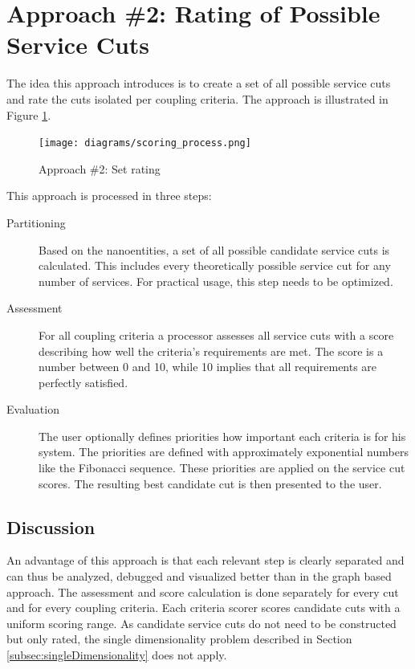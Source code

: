 \section{Approach \#2: Rating of Possible Service Cuts}

The idea this approach introduces is to create a set of all possible service cuts and rate the cuts isolated per coupling criteria. The approach is illustrated in Figure \ref{fig:setProcess}.


\begin{figure}[H]
	\begin{center}
		\texttt{[image: diagrams/scoring\_process.png]}
	\end{center}
	\caption{Approach \#2: Set rating}
	\label{fig:setProcess}
\end{figure}

This approach is processed in three steps:

\begin{description}
	\item[Partitioning] Based on the nanoentities, a set of all possible candidate service cuts is calculated. This includes every theoretically possible service cut for any number of services. For practical usage, this step needs to be optimized. 
	\item[Assessment] For all coupling criteria a processor assesses all service cuts with a score describing how well the criteria's requirements are met. The score is a number between 0 and 10, while 10 implies that all requirements are perfectly satisfied. 
	\item[Evaluation] The user optionally defines priorities how important each criteria is for his system. The priorities are defined with approximately exponential numbers like the Fibonacci sequence. These priorities are applied on the service cut scores. The resulting best candidate cut is then presented to the user.
\end{description}

\subsection{Discussion}

An advantage of this approach is that each relevant step is clearly separated and can thus be analyzed, debugged and visualized better than in the graph based approach. The assessment and score calculation is done separately for every cut and for every coupling criteria. Each criteria scorer scores candidate cuts with a uniform scoring range. As candidate service cuts do not need to be constructed but only rated, the single dimensionality problem described in Section \ref{subsec:singleDimensionality} does not apply.

